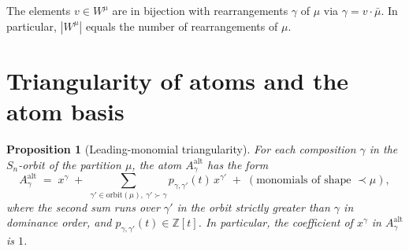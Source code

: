 \documentclass[11pt]{article}
\newtheorem{proposition}[theorem]{Proposition}
\theoremstyle{definition}
\begin{document}
The elements $v \in W^\mu$ are in bijection with rearrangements $\gamma$
of $\mu$ via $\gamma = v \cdot \bar\mu$. In particular, $|W^\mu|$ equals
the number of rearrangements of $\mu$.

\section{Triangularity of atoms and the atom basis}

\begin{proposition}[Leading-monomial triangularity]\label{prop:atom_triangular}
For each composition $\gamma$ in the $S_n$-orbit of the partition $\mu$,
the atom $A^{\mathrm{alt}}_\gamma$ has the form
\[
A^{\mathrm{alt}}_\gamma \;=\; x^\gamma \;+\;
  \sum_{\gamma' \in \mathrm{orbit}(\mu),\ \gamma' \succ \gamma} p_{\gamma,\gamma'}(t)\, x^{\gamma'}
  \;+\; (\text{monomials of shape } \prec \mu),
\]
where the second sum runs over $\gamma'$ in the orbit strictly greater
than $\gamma$ in dominance order, and $p_{\gamma,\gamma'}(t) \in \mathbb{Z}[t]$.
In particular, the coefficient of $x^\gamma$ in $A^{\mathrm{alt}}_\gamma$ is $1$.
\end{proposition}
\end{document}
